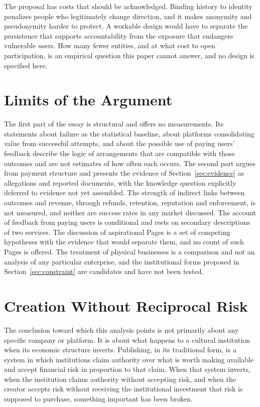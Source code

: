 \documentclass[12pt, a4paper]{article}
\begin{document}
The proposal has costs that should be acknowledged. Binding history to identity penalizes people who legitimately change direction, and it makes anonymity and pseudonymity harder to protect. A workable design would have to separate the persistence that supports accountability from the exposure that endangers vulnerable users. How many fewer entities, and at what cost to open participation, is an empirical question this paper cannot answer, and no design is specified here.

\section{Limits of the Argument}

The first part of the essay is structural and offers no measurements. Its statements about failure as the statistical baseline, about platforms consolidating value from successful attempts, and about the possible use of paying users' feedback describe the logic of arrangements that are compatible with those outcomes and are not estimates of how often each occurs. The second part argues from payment structure and presents the evidence of Section~\ref{sec:evidence} as allegations and reported documents, with the knowledge question explicitly deferred to evidence not yet assembled. The strength of indirect links between outcomes and revenue, through refunds, retention, reputation and enforcement, is not measured, and neither are success rates in any market discussed. The account of feedback from paying users is conditional and rests on secondary descriptions of two services. The discussion of aspirational Pages is a set of competing hypotheses with the evidence that would separate them, and no count of such Pages is offered. The treatment of physical businesses is a comparison and not an analysis of any particular enterprise, and the institutional forms proposed in Section~\ref{sec:constraint} are candidates and have not been tested.

\section{Creation Without Reciprocal Risk}

The conclusion toward which this analysis points is not primarily about any specific company or platform. It is about what happens to a cultural institution when its economic structure inverts. Publishing, in its traditional form, is a system in which institutions claim authority over what is worth making available and accept financial risk in proportion to that claim. When that system inverts, when the institution claims authority without accepting risk, and when the creator accepts risk without receiving the institutional investment that risk is supposed to purchase, something important has been broken.
\end{document}
